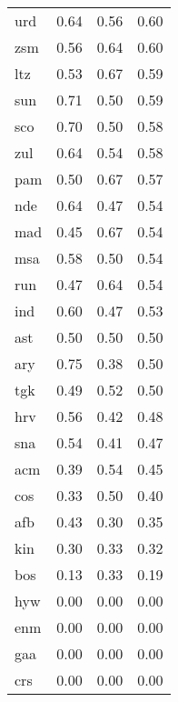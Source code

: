 \begin{table}
\begin{tabular}{lrrr}
urd & 0.64 & 0.56 & 0.60 \\
zsm & 0.56 & 0.64 & 0.60 \\
ltz & 0.53 & 0.67 & 0.59 \\
sun & 0.71 & 0.50 & 0.59 \\
sco & 0.70 & 0.50 & 0.58 \\
zul & 0.64 & 0.54 & 0.58 \\
pam & 0.50 & 0.67 & 0.57 \\
nde & 0.64 & 0.47 & 0.54 \\
mad & 0.45 & 0.67 & 0.54 \\
msa & 0.58 & 0.50 & 0.54 \\
run & 0.47 & 0.64 & 0.54 \\
ind & 0.60 & 0.47 & 0.53 \\
ast & 0.50 & 0.50 & 0.50 \\
ary & 0.75 & 0.38 & 0.50 \\
tgk & 0.49 & 0.52 & 0.50 \\
hrv & 0.56 & 0.42 & 0.48 \\
sna & 0.54 & 0.41 & 0.47 \\
acm & 0.39 & 0.54 & 0.45 \\
cos & 0.33 & 0.50 & 0.40 \\
afb & 0.43 & 0.30 & 0.35 \\
kin & 0.30 & 0.33 & 0.32 \\
bos & 0.13 & 0.33 & 0.19 \\
hyw & 0.00 & 0.00 & 0.00 \\
enm & 0.00 & 0.00 & 0.00 \\
gaa & 0.00 & 0.00 & 0.00 \\
crs & 0.00 & 0.00 & 0.00 \\
\bottomrule
\end{tabular}
\end{table}
